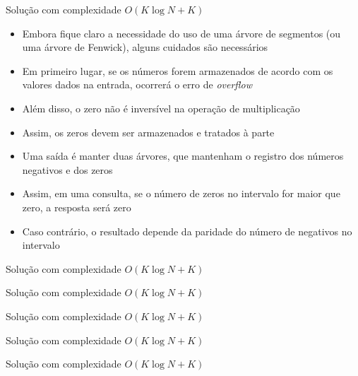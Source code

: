 \begin{frame}[fragile]{Solução com complexidade $O(K\log N + K)$}

    \begin{itemize}
        \item Embora fique claro a necessidade do uso de uma árvore de segmentos (ou uma árvore
            de Fenwick), alguns cuidados são necessários

       \item Em primeiro lugar, se os números forem armazenados de acordo com os valores dados
            na entrada, ocorrerá o erro de \textit{overflow}

        \item Além disso, o zero não é inversível na operação de multiplicação

        \item Assim, os zeros devem ser armazenados e tratados à parte

        \item Uma saída é manter duas árvores, que mantenham o registro dos números negativos e 
            dos zeros

        \item Assim, em uma consulta, se o número de zeros no intervalo for maior que zero, a 
            resposta será zero

        \item Caso contrário, o resultado depende da paridade do número de negativos no intervalo
   \end{itemize}

\end{frame}

\begin{frame}[fragile]{Solução com complexidade $O(K\log N + K)$}
\end{frame}

\begin{frame}[fragile]{Solução com complexidade $O(K\log N + K)$}
\end{frame}

\begin{frame}[fragile]{Solução com complexidade $O(K\log N + K)$}
\end{frame}

\begin{frame}[fragile]{Solução com complexidade $O(K\log N + K)$}
\end{frame}

\begin{frame}[fragile]{Solução com complexidade $O(K\log N + K)$}
\end{frame}
